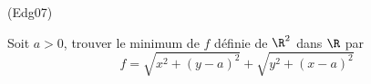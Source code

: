 \begin{tiny}(Edg07)\end{tiny}
Soit $a>0$, trouver le minimum de $f$ d{\'e}finie de $\R^{2}$
dans $\R$ par
\begin{displaymath}
f=\sqrt{x^{2}+(y-a)^{2}}+\sqrt{y^{2}+(x-a)^{2}}
 \end{displaymath}
